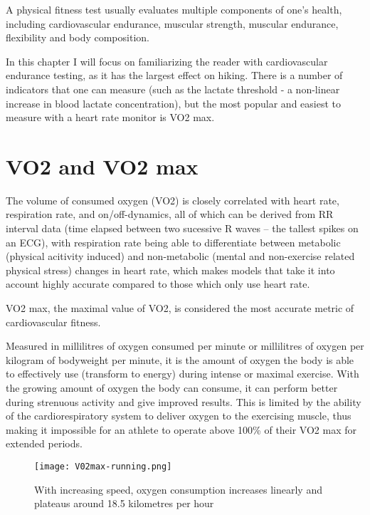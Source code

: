 A physical fitness test usually evaluates multiple components of one's health, including cardiovascular endurance, muscular strength, muscular endurance, flexibility and body composition.

In this chapter I will focus on familiarizing the reader with cardiovascular endurance testing, as it has the largest effect on hiking.
There is a number of indicators that one can measure (such as the lactate threshold - a non-linear increase in blood lactate concentration\cite{lactate-threshold}), 
but the most popular and easiest to measure with a heart rate monitor is VO2 max.

\section{VO2 and VO2 max}

The volume of consumed oxygen (VO2) is closely correlated with heart rate, respiration rate, and on/off-dynamics, all of which can be derived from RR interval data (time elapsed between two sucessive R waves -- the tallest spikes on an ECG),
with respiration rate being able to differentiate between metabolic (physical acitivity induced) and non-metabolic (mental and non-exercise related physical stress) changes in heart rate,
which makes models that take it into account highly accurate compared to those which only use heart rate.\cite{vo2-hr-firstbeat}

VO2 max, the maximal value of VO2, is considered the most accurate metric of cardiovascular fitness.

Measured in millilitres of oxygen consumed per minute or millilitres of oxygen per kilogram of bodyweight per minute, it is the amount of oxygen the body is able to effectively use (transform to energy) during intense or maximal exercise.
With the growing amount of oxygen the body can consume, it can perform better during strenuous activity and give improved results.\cite{vo2max-definition}
This is limited by the ability of the cardiorespiratory system to deliver oxygen to the exercising muscle, thus making it impossible for an athlete to operate above 100\% of their VO2 max for extended periods.\cite{vo2max-oxygen-delivery}

\begin{figure}[h]
    \texttt{[image: V02max-running.png]}
    \caption{With increasing speed, oxygen consumption increases linearly and plateaus around 18.5 kilometres per hour \cite{vo2max-speed-img}}
\end{figure}

